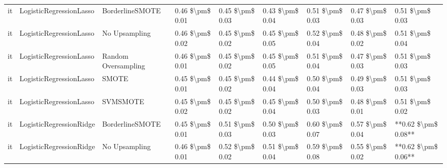 \begin{tabular}{lllllllll}
      it &         LogisticRegressionLasso &               BorderlineSMOTE & 0.46 \$\textbackslash pm\$ 0.01 &           0.45 \$\textbackslash pm\$ 0.03 &       0.43 \$\textbackslash pm\$ 0.04 &        0.51 \$\textbackslash pm\$ 0.03 &                         0.47 \$\textbackslash pm\$ 0.03 &     0.51 \$\textbackslash pm\$ 0.03 \\
      it &         LogisticRegressionLasso &                 No Upsampling & 0.46 \$\textbackslash pm\$ 0.02 &           0.45 \$\textbackslash pm\$ 0.02 &       0.45 \$\textbackslash pm\$ 0.05 &        0.52 \$\textbackslash pm\$ 0.04 &                         0.48 \$\textbackslash pm\$ 0.02 &     0.51 \$\textbackslash pm\$ 0.04 \\
      it &         LogisticRegressionLasso &           Random Oversampling & 0.46 \$\textbackslash pm\$ 0.01 &           0.45 \$\textbackslash pm\$ 0.02 &       0.45 \$\textbackslash pm\$ 0.05 &        0.51 \$\textbackslash pm\$ 0.04 &                         0.47 \$\textbackslash pm\$ 0.03 &     0.51 \$\textbackslash pm\$ 0.03 \\
      it &         LogisticRegressionLasso &                         SMOTE & 0.45 \$\textbackslash pm\$ 0.01 &           0.45 \$\textbackslash pm\$ 0.02 &       0.44 \$\textbackslash pm\$ 0.04 &        0.50 \$\textbackslash pm\$ 0.04 &                         0.49 \$\textbackslash pm\$ 0.03 &     0.51 \$\textbackslash pm\$ 0.03 \\
      it &         LogisticRegressionLasso &                      SVMSMOTE & 0.45 \$\textbackslash pm\$ 0.02 &           0.45 \$\textbackslash pm\$ 0.02 &       0.45 \$\textbackslash pm\$ 0.04 &        0.50 \$\textbackslash pm\$ 0.03 &                         0.48 \$\textbackslash pm\$ 0.01 &     0.51 \$\textbackslash pm\$ 0.02 \\
      it &         LogisticRegressionRidge &               BorderlineSMOTE & 0.45 \$\textbackslash pm\$ 0.01 &           0.51 \$\textbackslash pm\$ 0.03 &       0.50 \$\textbackslash pm\$ 0.03 &        0.60 \$\textbackslash pm\$ 0.07 &                         0.57 \$\textbackslash pm\$ 0.04 & **0.62 \$\textbackslash pm\$ 0.08** \\
      it &         LogisticRegressionRidge &                 No Upsampling & 0.46 \$\textbackslash pm\$ 0.01 &           0.52 \$\textbackslash pm\$ 0.02 &       0.51 \$\textbackslash pm\$ 0.04 &        0.59 \$\textbackslash pm\$ 0.08 &                         0.55 \$\textbackslash pm\$ 0.02 & **0.62 \$\textbackslash pm\$ 0.06** \\

\end{tabular}

